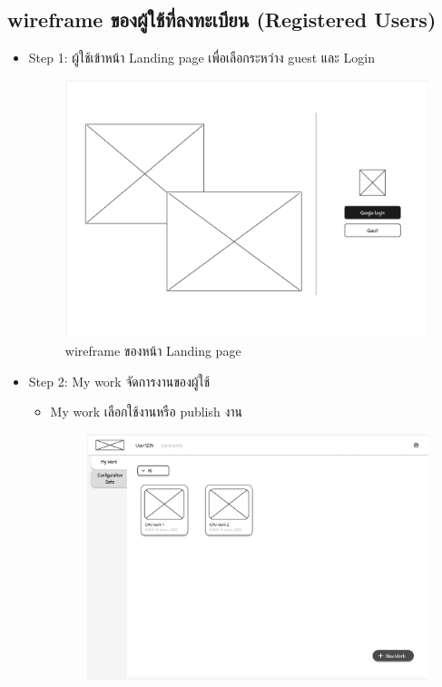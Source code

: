 \begin{mypara}
\subsection{wireframe ของผู้ใช้ที่ลงทะเบียน (Registered Users)}
\begin{itemize}
    \item Step 1: ผู้ใช้เข้าหน้า Landing page เพื่อเลือกระหว่าง guest และ Login
    \begin{figure}[H]
    \centering
    \includegraphics[scale=0.4]
    {homepage.png}
    \caption{wireframe ของหน้า Landing page}
    \label{fig:WireframeHomepageLogin}
    \end{figure}
    \item Step 2: My work จัดการงานของผู้ใช้
    \begin{itemize}
      \item My work เลือกใช้งานหรือ publish งาน
      \begin{figure}[H]
      \centering
      \includegraphics[scale=0.4]{my_work.png} 

\end{figure}
\end{itemize}
\end{itemize}
\end{mypara}
